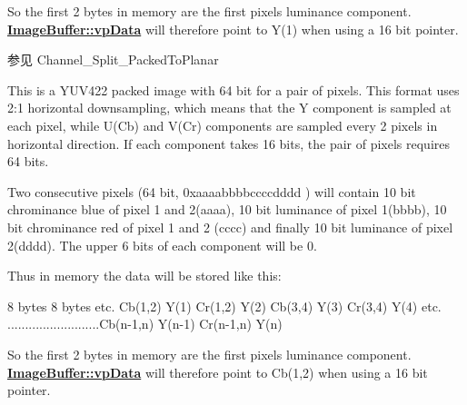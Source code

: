 \begin{Desc}
\begin{description}
So the first 2 bytes in memory are the first pixels luminance component. {\bfseries \hyperlink{struct_image_buffer_ab67c9c21d749e786302c848b508e0673}{Image\+Buffer\+::vp\+Data}} will therefore point to Y(1) when using a 16 bit pointer.

\begin{DoxySeeAlso}{参见}
Channel\+\_\+\+Split\+\_\+\+Packed\+To\+Planar 
\end{DoxySeeAlso}
\item[{\em 
\hypertarget{group___common_interface_gga456e8aa76e06bb761f27c52141475985ad58e306c23bd951704a0f68cf24a6f2e}{ibpf\+Y\+U\+V422\+\_\+\+U\+Y\+V\+Y\+\_\+10\+Packed}\label{group___common_interface_gga456e8aa76e06bb761f27c52141475985ad58e306c23bd951704a0f68cf24a6f2e}
}]This is a Y\+U\+V422 packed image with 64 bit for a pair of pixels. This format uses 2\+:1 horizontal downsampling, which means that the Y component is sampled at each pixel, while U(\+Cb) and V(\+Cr) components are sampled every 2 pixels in horizontal direction. If each component takes 16 bits, the pair of pixels requires 64 bits.

Two consecutive pixels (64 bit, 0xaaaabbbbccccdddd ) will contain 10 bit chrominance blue of pixel 1 and 2(aaaa), 10 bit luminance of pixel 1(bbbb), 10 bit chrominance red of pixel 1 and 2 (cccc) and finally 10 bit luminance of pixel 2(dddd). The upper 6 bits of each component will be 0.

Thus in memory the data will be stored like this\+:


\begin{DoxyCode}
8 bytes                   8 bytes                         etc.
Cb(1,2) Y(1) Cr(1,2) Y(2) Cb(3,4)   Y(3)   Cr(3,4)   Y(4)    etc.
..........................Cb(n-1,n) Y(n-1) Cr(n-1,n) Y(n)
\end{DoxyCode}


So the first 2 bytes in memory are the first pixels luminance component. {\bfseries \hyperlink{struct_image_buffer_ab67c9c21d749e786302c848b508e0673}{Image\+Buffer\+::vp\+Data}} will therefore point to Cb(1,2) when using a 16 bit pointer.


\end{description}
\end{Desc}
